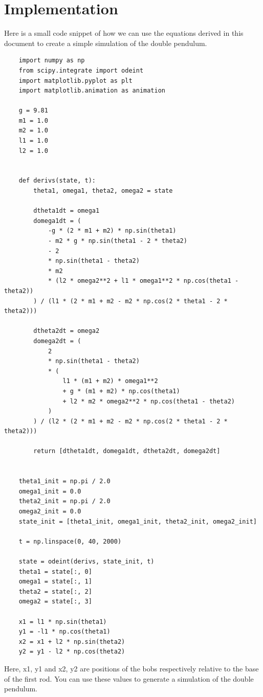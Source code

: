 \documentclass{article}
\begin{document}
\newpage
\section{Implementation}
Here is a small code snippet of how we can use the equations derived in this document to create a simple simulation of the double pendulum.
\begin{lstlisting}
    import numpy as np
    from scipy.integrate import odeint
    import matplotlib.pyplot as plt
    import matplotlib.animation as animation
    
    g = 9.81
    m1 = 1.0
    m2 = 1.0
    l1 = 1.0
    l2 = 1.0
    
    
    def derivs(state, t):
        theta1, omega1, theta2, omega2 = state
    
        dtheta1dt = omega1
        domega1dt = (
            -g * (2 * m1 + m2) * np.sin(theta1)
            - m2 * g * np.sin(theta1 - 2 * theta2)
            - 2
            * np.sin(theta1 - theta2)
            * m2
            * (l2 * omega2**2 + l1 * omega1**2 * np.cos(theta1 - theta2))
        ) / (l1 * (2 * m1 + m2 - m2 * np.cos(2 * theta1 - 2 * theta2)))
    
        dtheta2dt = omega2
        domega2dt = (
            2
            * np.sin(theta1 - theta2)
            * (
                l1 * (m1 + m2) * omega1**2
                + g * (m1 + m2) * np.cos(theta1)
                + l2 * m2 * omega2**2 * np.cos(theta1 - theta2)
            )
        ) / (l2 * (2 * m1 + m2 - m2 * np.cos(2 * theta1 - 2 * theta2)))
    
        return [dtheta1dt, domega1dt, dtheta2dt, domega2dt]
    
    
    theta1_init = np.pi / 2.0
    omega1_init = 0.0
    theta2_init = np.pi / 2.0
    omega2_init = 0.0
    state_init = [theta1_init, omega1_init, theta2_init, omega2_init]
    
    t = np.linspace(0, 40, 2000)
    
    state = odeint(derivs, state_init, t)
    theta1 = state[:, 0]
    omega1 = state[:, 1]
    theta2 = state[:, 2]
    omega2 = state[:, 3]
    
    x1 = l1 * np.sin(theta1)
    y1 = -l1 * np.cos(theta1)
    x2 = x1 + l2 * np.sin(theta2)
    y2 = y1 - l2 * np.cos(theta2)
\end{lstlisting}
Here, x1, y1 and x2, y2 are positions of the bobs respectively relative to the base of the first rod. You can use these values to generate a simulation of the double pendulum.
\newpage
\end{document}
